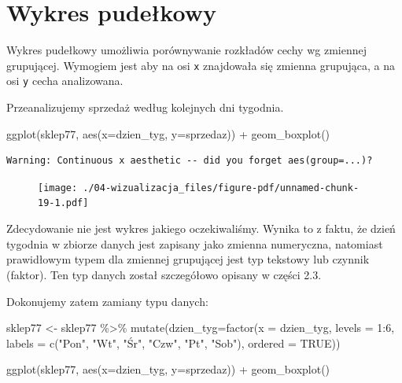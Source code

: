\documentclass[
  letterpaper,
  DIV=11,
  numbers=noendperiod]{scrreprt}
\newenvironment{Shaded}{\begin{snugshade}}{\end{snugshade}}
\newcommand{\AttributeTok}[1]{\textcolor[rgb]{0.40,0.45,0.13}{#1}}
\newcommand{\ConstantTok}[1]{\textcolor[rgb]{0.56,0.35,0.01}{#1}}
\newcommand{\DecValTok}[1]{\textcolor[rgb]{0.68,0.00,0.00}{#1}}
\newcommand{\FunctionTok}[1]{\textcolor[rgb]{0.28,0.35,0.67}{#1}}
\newcommand{\NormalTok}[1]{\textcolor[rgb]{0.00,0.23,0.31}{#1}}
\newcommand{\OtherTok}[1]{\textcolor[rgb]{0.00,0.23,0.31}{#1}}
\newcommand{\SpecialCharTok}[1]{\textcolor[rgb]{0.37,0.37,0.37}{#1}}
\newcommand{\StringTok}[1]{\textcolor[rgb]{0.13,0.47,0.30}{#1}}
\begin{document}
\hypertarget{wykres-pudeux142kowy}{%
\section{Wykres pudełkowy}\label{wykres-pudeux142kowy}}

Wykres pudełkowy umożliwia porównywanie rozkładów cechy wg zmiennej
grupującej. Wymogiem jest aby na osi \texttt{x} znajdowała się zmienna
grupująca, a na osi \texttt{y} cecha analizowana.

Przeanalizujemy sprzedaż według kolejnych dni tygodnia.

\begin{Shaded}
\begin{Highlighting}[]
\FunctionTok{ggplot}\NormalTok{(sklep77, }\FunctionTok{aes}\NormalTok{(}\AttributeTok{x=}\NormalTok{dzien\_tyg, }\AttributeTok{y=}\NormalTok{sprzedaz)) }\SpecialCharTok{+} \FunctionTok{geom\_boxplot}\NormalTok{()}
\end{Highlighting}
\end{Shaded}

\begin{verbatim}
Warning: Continuous x aesthetic -- did you forget aes(group=...)?
\end{verbatim}

\begin{figure}[H]

{\centering \texttt{[image: ./04-wizualizacja\_files/figure-pdf/unnamed-chunk-19-1.pdf]}

}

\end{figure}

Zdecydowanie nie jest wykres jakiego oczekiwaliśmy. Wynika to z faktu,
że dzień tygodnia w zbiorze danych jest zapisany jako zmienna
numeryczna, natomiast prawidłowym typem dla zmiennej grupującej jest typ
tekstowy lub czynnik (faktor). Ten typ danych został szczegółowo opisany
w części 2.3.

Dokonujemy zatem zamiany typu danych:

\begin{Shaded}
\begin{Highlighting}[]
\NormalTok{sklep77 }\OtherTok{\textless{}{-}}\NormalTok{ sklep77 }\SpecialCharTok{\%\textgreater{}\%}
  \FunctionTok{mutate}\NormalTok{(}\AttributeTok{dzien\_tyg=}\FunctionTok{factor}\NormalTok{(}\AttributeTok{x =}\NormalTok{ dzien\_tyg,}
                          \AttributeTok{levels =} \DecValTok{1}\SpecialCharTok{:}\DecValTok{6}\NormalTok{,}
                          \AttributeTok{labels =} \FunctionTok{c}\NormalTok{(}\StringTok{"Pon"}\NormalTok{, }\StringTok{"Wt"}\NormalTok{, }\StringTok{"Śr"}\NormalTok{, }\StringTok{"Czw"}\NormalTok{, }\StringTok{"Pt"}\NormalTok{, }\StringTok{"Sob"}\NormalTok{),}
                          \AttributeTok{ordered =} \ConstantTok{TRUE}\NormalTok{))}

\FunctionTok{ggplot}\NormalTok{(sklep77, }\FunctionTok{aes}\NormalTok{(}\AttributeTok{x=}\NormalTok{dzien\_tyg, }\AttributeTok{y=}\NormalTok{sprzedaz)) }\SpecialCharTok{+}
  \FunctionTok{geom\_boxplot}\NormalTok{() }
\end{Highlighting}
\end{Shaded}
\end{document}
